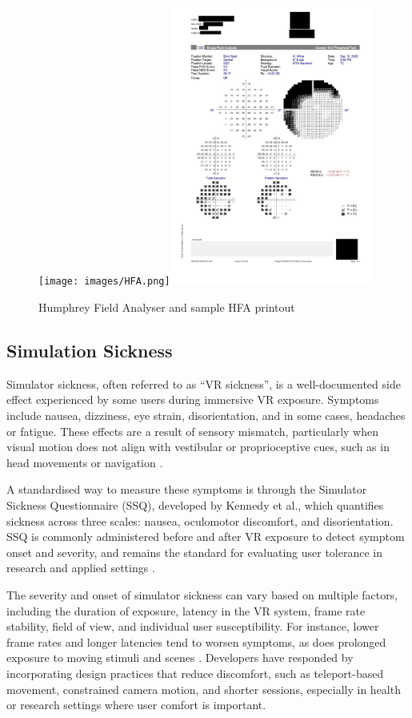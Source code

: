 \documentclass{l4proj}
\begin{document}
\begin{appendices}
\begin{figure}
    \centering
    \texttt{[image: images/HFA.png]}\hfill
    \includegraphics[width=6.5cm]{images/ExampleofVFTreport.png}
    \caption{Humphrey Field Analyser\citep{vftc} and sample HFA printout \citep{vftb}}
    \label{fig:HFA}
\end{figure}

\subsection{Simulation Sickness}

Simulator sickness, often referred to as “VR sickness”, is a well-documented side effect experienced by some users during immersive VR exposure. Symptoms include nausea, dizziness, eye strain, disorientation, and in some cases, headaches or fatigue. These effects are a result of sensory mismatch, particularly when visual motion does not align with vestibular or proprioceptive cues, such as in head movements or navigation \citep{vrb}.

A standardised way to measure these symptoms is through the Simulator Sickness Questionnaire (SSQ), developed by Kennedy et al., which quantifies sickness across three scales: nausea, oculomotor discomfort, and disorientation. SSQ is commonly administered before and after VR exposure to detect symptom onset and severity, and remains the standard for evaluating user tolerance in research and applied settings \citep{vra}.

The severity and onset of simulator sickness can vary based on multiple factors, including the duration of exposure, latency in the VR system, frame rate stability, field of view, and individual user susceptibility. For instance, lower frame rates and longer latencies tend to worsen symptoms, as does prolonged exposure to moving stimuli and scenes \citep{vrb}. Developers have responded by incorporating design practices that reduce discomfort, such as teleport-based movement, constrained camera motion, and shorter sessions, especially in health or research settings where user comfort is important.


\end{appendices}
\end{document}
